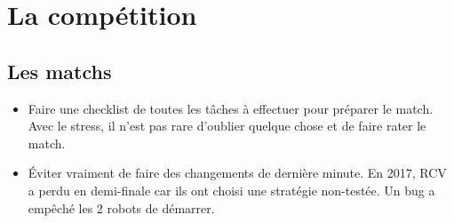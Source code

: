 \documentclass[a4paper, 11pt]{report}
\begin{document}
\chapter{La compétition}

\section{Les matchs}
\begin{itemize}
\item Faire une checklist de toutes les tâches à effectuer pour préparer le match. Avec le stress, il n’est pas rare d’oublier quelque chose et de faire rater le match.
\item Éviter vraiment de faire des changements de dernière minute. En 2017, RCV a perdu en demi-finale car ils ont choisi une stratégie non-testée. Un bug a empêché les 2 robots de démarrer.
\end{itemize}
\end{document}
